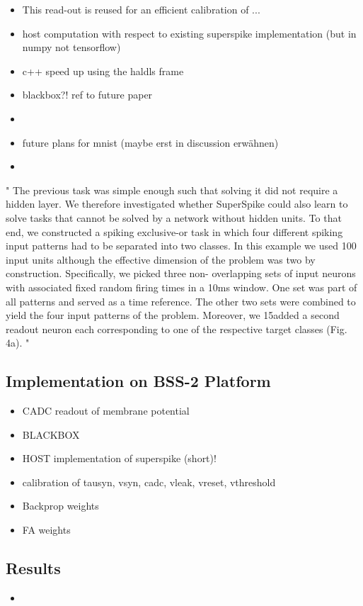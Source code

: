 \begin{itemize}
	\item This read-out is reused for an efficient calibration of ...
	\item host computation with respect to existing superspike implementation (but in numpy not tensorflow)
	\item c++ speed up using the haldls frame
	\item blackbox?! ref to future paper
	\item 
	\item future plans for mnist (maybe erst in discussion erwähnen)
	\item 
\end{itemize}



"
The previous task was simple enough such that solving it did not require a hidden
layer. We therefore investigated whether SuperSpike could also learn to solve tasks
that cannot be solved by a network without hidden units. To that end, we constructed
a spiking exclusive-or task in which four different spiking input patterns had to be
separated into two classes. In this example we used 100 input units although the effective
dimension of the problem was two by construction. Specifically, we picked three non-
overlapping sets of input neurons with associated fixed random firing times in a 10ms
window. One set was part of all patterns and served as a time reference. The other
two sets were combined to yield the four input patterns of the problem. Moreover, we
15added a second readout neuron each corresponding to one of the respective target classes
(Fig. 4a).
"


\subsection{Implementation on BSS-2 Platform}
\begin{itemize}
	\item CADC readout of membrane potential
	\item BLACKBOX
	\item HOST implementation of superspike (short)!
	\item calibration of tausyn, vsyn, cadc, vleak, vreset, vthreshold
	\item Backprop weights
	\item FA weights
\end{itemize}
	
\subsection{Results}
\begin{itemize}
	\item 
\end{itemize}